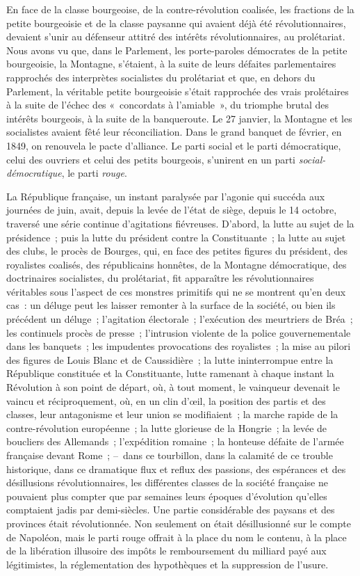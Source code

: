 \documentclass[french,twoside]{book} %
\begin{document}
En face de la classe bourgeoise, de la contre-révolution coalisée, les fractions de la petite bourgeoisie et de la classe paysanne qui avaient déjà été révolutionnaires, devaient s’unir au défenseur attitré des intérêts révolutionnaires, au prolétariat. Nous avons vu que, dans le Parlement, les porte-paroles démocrates de la petite bourgeoisie, la Montagne, s’étaient, à la suite de leurs défaites parlementaires rapprochés des interprètes socialistes du prolétariat et que, en dehors du Parlement, la véritable petite bourgeoisie s’était rapprochée des vrais prolétaires à la suite de l’échec des « concordats à l’amiable », du triomphe brutal des intérêts bourgeois, à la suite de la banqueroute. Le 27 janvier, la Montagne et les socialistes avaient fêté leur réconciliation. Dans le grand banquet de février, en 1849, on renouvela le pacte d’alliance. Le parti social et le parti démocratique, celui des ouvriers et celui des petits bourgeois, s’unirent en un parti \emph{social-démocratique}, le parti \emph{rouge}.\par
La République française, un instant paralysée par l’agonie qui succéda aux journées de juin, avait, depuis la levée de l’état de siège, depuis le 14 octobre, traversé une série continue d’agitations fiévreuses. D’abord, la lutte au sujet de la présidence ; puis la lutte du président contre la Constituante ; la lutte au sujet des clubs, le procès de Bourges, qui, en face des petites figures du président, des royalistes coalisés, des républicains honnêtes, de la Montagne démocratique, des doctrinaires socialistes, du prolétariat, fit apparaître les révolutionnaires véritables sous l’aspect de ces monstres primitifs qui ne se montrent qu’en deux cas : un déluge peut les laisser remonter à la surface de la société, ou bien ils précédent un déluge ; l’agitation électorale ; l’exécution des meurtriers de Bréa ; les continuels procès de presse ; l’intrusion violente de la police gouvernementale dans les banquets ; les impudentes provocations des royalistes ; la mise au pilori des figures de Louis Blanc et de Caussidière ; la lutte ininterrompue entre la République constituée et la Constituante, lutte ramenant à chaque instant la Révolution à son point de départ, où, à tout moment, le vainqueur devenait le vaincu et réciproquement, où, en un clin d’œil, la position des partis et des classes, leur antagonisme et leur union se modifiaient ; la marche rapide de la contre-révolution européenne ; la lutte glorieuse de la Hongrie ; la levée de boucliers des Allemands ; l’expédition romaine ; la honteuse défaite de l’armée française devant Rome ; – dans ce tourbillon, dans la calamité de ce trouble historique, dans ce dramatique flux et reflux des passions, des espérances et des désillusions révolutionnaires, les différentes classes de la société française ne pouvaient plus compter que par semaines leurs époques d’évolution qu’elles comptaient jadis par demi-siècles. Une partie considérable des paysans et des provinces était révolutionnée. Non seulement on était désillusionné sur le compte de Napoléon, mais le parti rouge offrait à la place du nom le contenu, à la place de la libération illusoire des impôts le remboursement du milliard payé aux légitimistes, la réglementation des hypothèques et la suppression de l’usure.\par
\end{document}
